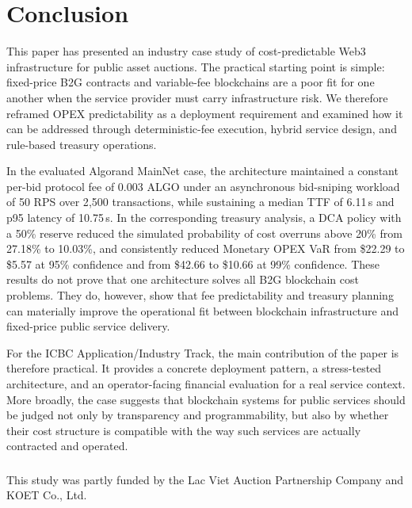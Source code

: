\documentclass[runningheads]{llncs}
\begin{document}
\section{Conclusion}

This paper has presented an industry case study of cost-predictable Web3
infrastructure for public asset auctions. The practical starting point is simple:
fixed-price B2G contracts and variable-fee blockchains are a poor fit for one
another when the service provider must carry infrastructure risk. We therefore
reframed OPEX predictability as a deployment requirement and examined how it
can be addressed through deterministic-fee execution, hybrid service design, and
rule-based treasury operations.

In the evaluated Algorand MainNet case, the architecture maintained a constant per-bid
protocol fee of 0.003 ALGO under an asynchronous bid-sniping workload of 50 RPS over
2{,}500 transactions, while sustaining a median TTF of 6.11\,s and p95 latency of
10.75\,s. In the corresponding treasury analysis, a DCA policy with a 50\% reserve reduced
the simulated probability of cost overruns above 20\% from 27.18\% to 10.03\%,
and consistently reduced Monetary OPEX VaR from \$22.29 to \$5.57 at 95\% confidence
and from \$42.66 to \$10.66 at 99\% confidence. These results do not
prove that one architecture solves all B2G blockchain cost problems. They do,
however, show that fee predictability and treasury planning can materially improve
the operational fit between blockchain infrastructure and fixed-price public
service delivery.

For the ICBC Application/Industry Track, the main contribution of the paper is
therefore practical. It provides a concrete deployment pattern, a stress-tested
architecture, and an operator-facing financial evaluation for a real service
context. More broadly, the case suggests that blockchain systems for public
services should be judged not only by transparency and programmability, but
also by whether their cost structure is compatible with the way such services are
actually contracted and operated.


\begin{credits}
\subsubsection{\ackname} This study was partly funded by the Lac Viet Auction Partnership Company and KOET Co., Ltd.
\end{credits}
\end{document}

